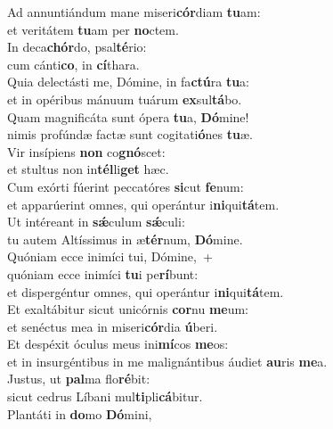 \evenverse Ad annuntiándum mane miseri\textbf{cór}diam \textbf{tu}am:~\*\\
\evenverse et veritátem \textbf{tu}am per \textbf{no}ctem.\\
\oddverse In deca\textbf{chór}do, psal\textbf{té}rio:~\*\\
\oddverse cum cánti\textbf{co}, in \textbf{cí}thara.\\
\evenverse Quia delectásti me, Dómine, in fa\textbf{ctú}ra \textbf{tu}a:~\*\\
\evenverse et in opéribus mánuum tuárum \textbf{ex}sul\textbf{tá}bo.\\
\oddverse Quam magnificáta sunt ópera \textbf{tu}a, \textbf{Dó}mine!~\*\\
\oddverse nimis profúndæ factæ sunt cogitati\textbf{ó}nes \textbf{tu}æ.\\
\evenverse Vir insípiens \textbf{non} co\textbf{gnó}scet:~\*\\
\evenverse et stultus non in\textbf{tél}li\textbf{get} hæc.\\
\oddverse Cum exórti fúerint peccatóres \textbf{si}cut \textbf{fe}num:~\*\\
\oddverse et apparúerint omnes, qui operántur i\textbf{ni}qui\textbf{tá}tem.\\
\evenverse Ut intéreant in \textbf{sǽ}culum \textbf{sǽ}culi:~\*\\
\evenverse tu autem Altíssimus in æ\textbf{tér}num, \textbf{Dó}mine.\\
\oddverse Quóniam ecce inimíci tui, Dómine,~+\\
\oddverse  quóniam ecce inimíci \textbf{tu}i pe\textbf{rí}bunt:~\*\\
\oddverse et dispergéntur omnes, qui operántur i\textbf{ni}qui\textbf{tá}tem.\\
\evenverse Et exaltábitur sicut unicórnis \textbf{cor}nu \textbf{me}um:~\*\\
\evenverse et senéctus mea in miseri\textbf{cór}dia \textbf{ú}beri.\\
\oddverse Et despéxit óculus meus ini\textbf{mí}cos \textbf{me}os:~\*\\
\oddverse et in insurgéntibus in me malignántibus áudiet \textbf{au}ris \textbf{me}a.\\
\evenverse Justus, ut \textbf{pal}ma flo\textbf{ré}bit:~\*\\
\evenverse sicut cedrus Líbani mul\textbf{ti}pli\textbf{cá}bitur.\\
\oddverse Plantáti in \textbf{do}mo \textbf{Dó}mini,~\*\\
